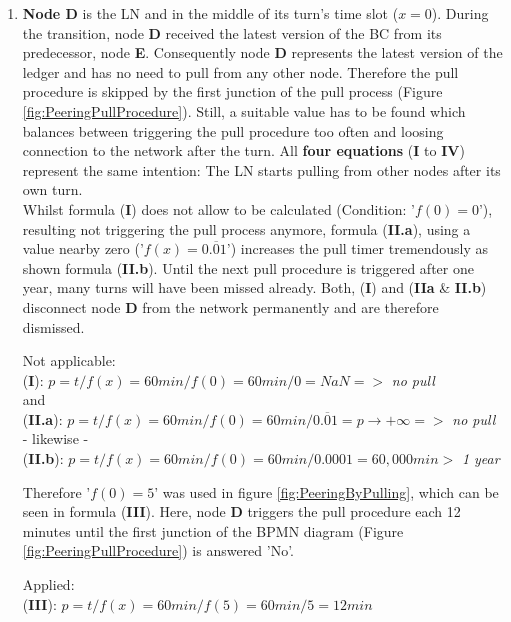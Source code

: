 \begin{enumerate}
	\item \textbf{Node D} is the \gls{LN} and in the middle of its turn's time slot ($x = 0$).
	During the transition, node \textbf{D} received the latest version of the \gls{BC} from its predecessor, node \textbf{E}.
	Consequently node \textbf{D} represents the latest version of the ledger and
	has no need to pull from any other node.
	Therefore the pull procedure is skipped by the first junction of the pull process (Figure \ref{fig:PeeringPullProcedure}).
	Still, a suitable value has to be found which balances between triggering
	the pull procedure too often and loosing connection to the network after the turn.
	All \textbf{four equations} (\textbf{I} to \textbf{IV}) represent the same intention: The \gls{LN} starts pulling from other nodes after its own turn. \\
	Whilst formula (\textbf{I}) does not allow to be calculated (Condition: '$f(0) = 0$'), resulting not triggering the pull process anymore,
	formula (\textbf{II.a}), using a value nearby zero ('$f(x) = 0.\overline{0}1$') increases the pull timer
	tremendously as shown formula (\textbf{II.b}).
	Until the next pull procedure is triggered after one year, many turns will have been missed already.
	Both, (\textbf{I}) and (\textbf{IIa} \& \textbf{II.b}) disconnect node \textbf{D} from the network permanently and are therefore dismissed.
	\begin{center}
		Not applicable: \\
		(\textbf{I}): $p = t/f(x) = 60min/f(0) = 60min/0 = NaN =>$ \textit{no pull} \\
		and \\
		(\textbf{II.a}): $p = t/f(x) = 60min/f(0) = 60min/0.\overline{0}1 = p \to +\infty =>$ \textit{no pull} \\
		- likewise - \\
		(\textbf{II.b}): $p = t/f(x) = 60min/f(0) = 60min/0.0001 = 60,000min >$ \textit{1 year} \\
	\end{center}
	Therefore '$f(0) = 5$' was used in figure \ref{fig:PeeringByPulling}, which can be seen in formula (\textbf{III}).
	Here, node \textbf{D} triggers the pull procedure each 12 minutes until the first junction
	of the \gls{BPMN} diagram (Figure \ref{fig:PeeringPullProcedure}) is answered 'No'.
	\begin{center}
		Applied: \\
		(\textbf{III}): $p = t/f(x) = 60min/f(5) = 60min/5 = 12min$ \\
	\end{center}

\end{enumerate}
